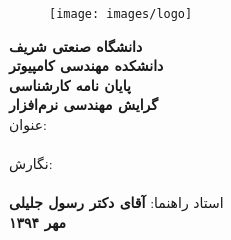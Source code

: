 \thispagestyle{empty}
\begin{center}
\vspace{-2cm}
\begin{figure}
\centerline{\texttt{[image: images/logo]}}
\end{figure}
\makeatletter
{\bf دانشگاه صنعتی شریف  }\\ 
{\bf دانشکده مهندسی کامپیوتر }\vspace{0.3cm}\\
{\bf پایان نامه کارشناسی  }\\ 
{ \bf گرایش مهندسی نرم‌افزار }\\
\vspace{0.4cm}
 عنوان:\\
\vspace{0.3cm}
{\large \bf  \@title}\vspace{1cm}\\

نگارش:\vspace{0.2cm}\\

{\Large \bf \@author}\\
\vspace{0.5cm}
 استاد راهنما: {\Large \bf  آقای دکتر رسول جلیلی }\\
\vspace{0.3cm}
{\large \bf  مهر ۱۳۹۴   }\\
\end{center}
\makeatother
\clearpage